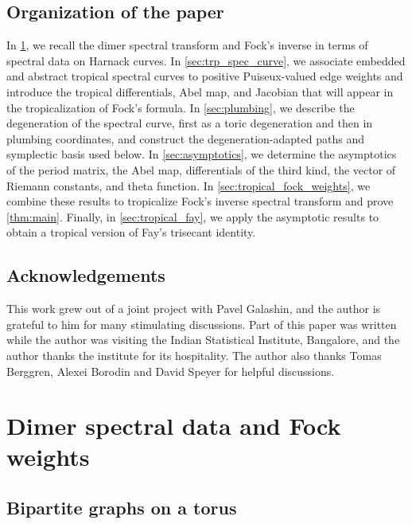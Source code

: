 \documentclass[12pt]{amsart}
\numberwithin{equation}{section}
\theoremstyle{definition}
\begin{document}
\subsection{Organization of the paper}

In \cref{sec:backgroudd}, we recall the dimer spectral transform and
Fock's inverse in terms of spectral data on Harnack curves. In \cref{sec:trp_spec_curve}, we associate embedded and abstract tropical spectral
curves to positive Puiseux-valued edge weights and introduce the
tropical differentials, Abel map, and Jacobian that will appear in the
tropicalization of Fock's formula. In \cref{sec:plumbing}, we describe
the degeneration of the spectral curve, first as a toric degeneration
and then in plumbing coordinates, and construct the
degeneration-adapted paths and symplectic basis used below.
In \cref{sec:asymptotics}, we determine the asymptotics of the period
matrix, the Abel map, differentials of the third kind, the vector of Riemann
constants, and theta function. In \cref{sec:tropical_fock_weights}, we combine these results to tropicalize Fock's inverse spectral transform and prove \cref{thm:main}. Finally, in \cref{sec:tropical_fay}, we apply the asymptotic results to obtain a tropical version of Fay's trisecant identity.

\subsection*{Acknowledgements}

This work grew out of a joint project with Pavel Galashin, and the author is grateful to him for many stimulating discussions. Part of this paper was written while the author was visiting the Indian Statistical Institute, Bangalore, and the author thanks the institute for its hospitality. The author also thanks Tomas Berggren, Alexei Borodin and David Speyer for helpful discussions.








\section{Dimer spectral data and Fock weights} \label{sec:backgroudd}




\subsection{Bipartite graphs on a torus}
\label{sec:bip_graph_torus}
\end{document}
